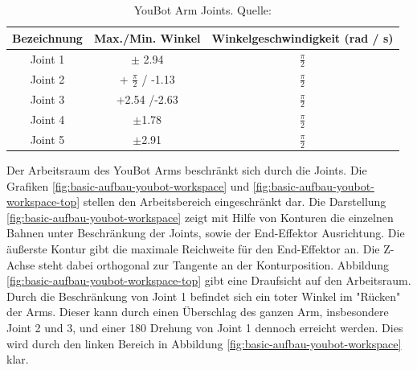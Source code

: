    \begin{table}[H]
   	\begin{tabular}{|c|c|c|}
   		\hline Bezeichnung & Max./Min. Winkel & Winkelgeschwindigkeit (rad / s) \\ 
   		\hline Joint 1 & $\pm$ 2.94 & $\frac{\pi}{2}$  \\ 
   		\hline Joint 2 & + $\frac{\pi}{2}$ / -1.13  & $\frac{\pi}{2}$ \\ 
   		\hline Joint 3 & +2.54 /-2.63 & $\frac{\pi}{2}$ \\ 
   		\hline Joint 4 & $\pm$1.78 & $\frac{\pi}{2}$ \\ 
   		\hline Joint 5 & $\pm$2.91 & $\frac{\pi}{2}$ \\ 
   		\hline 
   	\end{tabular}
   	\caption[YouBot Arm Joints]{YouBot Arm Joints. Quelle: \cite{monikaflorekjasinska2015}}
   	\label{tab:basic-aufbau-youbot-joints}
   \end{table}
   
   Der Arbeitsraum des YouBot Arms beschränkt sich durch die Joints. Die Grafiken \ref{fig:basic-aufbau-youbot-workspace} und \ref{fig:basic-aufbau-youbot-workspace-top} stellen den Arbeitsbereich eingeschränkt dar. Die Darstellung \ref{fig:basic-aufbau-youbot-workspace} zeigt mit Hilfe von Konturen die einzelnen Bahnen unter Beschränkung der Joints, sowie der End-Effektor Ausrichtung.  Die äußerste Kontur gibt die maximale Reichweite für den End-Effektor an. Die Z-Achse steht dabei orthogonal zur Tangente an der Konturposition. Abbildung \ref{fig:basic-aufbau-youbot-workspace-top} gibt eine Draufsicht auf den Arbeitsraum. Durch die Beschränkung von Joint 1 befindet sich ein toter Winkel im "Rücken" der Arms. Dieser kann durch einen Überschlag des ganzen Arm, insbesondere Joint 2 und 3, und einer 180 \textdegree Drehung von Joint 1 dennoch erreicht werden. Dies wird durch den linken Bereich in Abbildung \ref{fig:basic-aufbau-youbot-workspace} klar.
   
